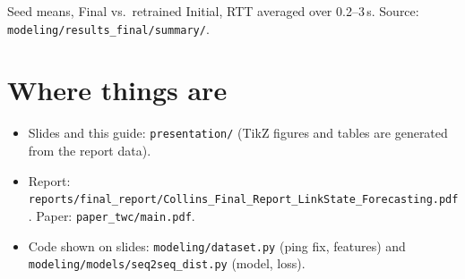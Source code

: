 \documentclass[11pt]{article}
\begin{document}
Seed means, Final vs.\ retrained Initial, RTT averaged over 0.2--3\,s. Source: \texttt{modeling/results\_final/summary/}.

\section*{Where things are}
\begin{itemize}
\item Slides and this guide: \texttt{presentation/} (TikZ figures and tables are generated from the report data).
\item Report: \texttt{reports/final\_report/Collins\_Final\_Report\_LinkState\_Forecasting.pdf}. Paper: \texttt{paper\_twc/main.pdf}.
\item Code shown on slides: \texttt{modeling/dataset.py} (ping fix, features) and \texttt{modeling/models/seq2seq\_dist.py} (model, loss).
\end{itemize}
\end{document}
